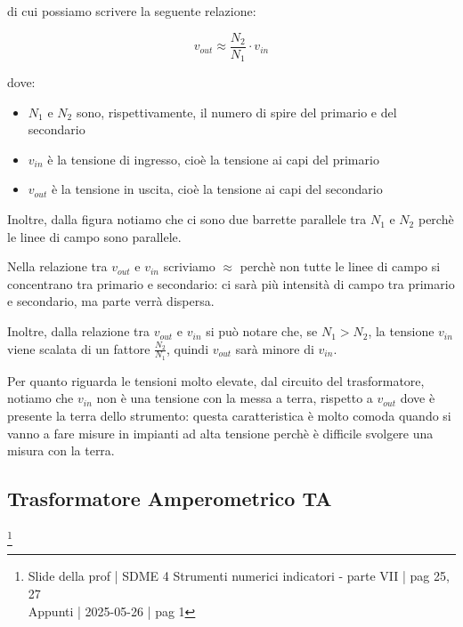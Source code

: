 di cui possiamo scrivere la seguente relazione: 

{
    \Large 
    \begin{equation}
        v_{out}
        \approx
        \frac{N_2}{N_1} \cdot v_{in}
    \end{equation}
}

dove: 

\begin{itemize}
    \item $N_1$ e $N_2$ sono, rispettivamente, il numero di spire del primario e del secondario 
    \item $v_{in}$ è la tensione di ingresso, cioè la tensione ai capi del primario 
    \item $v_{out}$ è la tensione in uscita, cioè la tensione ai capi del secondario
\end{itemize}

Inoltre, dalla figura notiamo che ci sono due barrette parallele tra $N_1$ e $N_2$ perchè le linee di campo sono parallele. \newline 

Nella relazione tra $v_{out}$ e $v_{in}$ scriviamo $\approx$ perchè non tutte le linee di campo si concentrano tra primario e secondario: 
ci sarà più intensità di campo tra primario e secondario, ma parte verrà dispersa. \newline 

Inoltre, dalla relazione tra $v_{out}$ e $v_{in}$ si può notare che, se $N_1 > N_2$, la tensione $v_{in}$ viene scalata di un fattore $\frac{N_2}{N_1}$, quindi $v_{out}$ sarà minore di $v_{in}$. \newline 

Per quanto riguarda le tensioni molto elevate, dal circuito del trasformatore, notiamo che 
$v_{in}$ non è una tensione con la messa a terra, rispetto a $v_{out}$ dove è presente la terra dello strumento: 
questa caratteristica è molto comoda quando si vanno a fare misure in impianti ad alta tensione perchè è difficile svolgere una misura con la terra. \newline

\newpage 

\subsection{Trasformatore Amperometrico TA}
\footnote{Slide della prof | SDME 4 Strumenti numerici indicatori - parte VII | pag 25, 27\\  
Appunti | 2025-05-26 | pag 1 }

